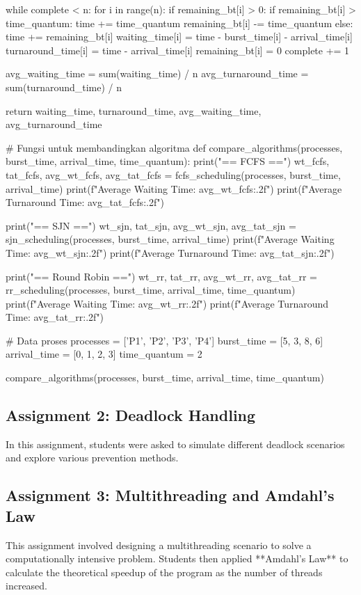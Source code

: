 \documentclass[12pt]{article}
\begin{document}
\begin{python}
    while complete < n:
        for i in range(n):
            if remaining_bt[i] > 0:
                if remaining_bt[i] > time_quantum:
                    time += time_quantum
                    remaining_bt[i] -= time_quantum
                else:
                    time += remaining_bt[i]
                    waiting_time[i] = time - burst_time[i] - arrival_time[i]
                    turnaround_time[i] = time - arrival_time[i]
                    remaining_bt[i] = 0
                    complete += 1

    avg_waiting_time = sum(waiting_time) / n
    avg_turnaround_time = sum(turnaround_time) / n

    return waiting_time, turnaround_time, avg_waiting_time, avg_turnaround_time

# Fungsi untuk membandingkan algoritma
def compare_algorithms(processes, burst_time, arrival_time, time_quantum):
    print("== FCFS ==")
    wt_fcfs, tat_fcfs, avg_wt_fcfs, avg_tat_fcfs = fcfs_scheduling(processes, burst_time, arrival_time)
    print(f"Average Waiting Time: {avg_wt_fcfs:.2f}")
    print(f"Average Turnaround Time: {avg_tat_fcfs:.2f}\n")

    print("== SJN ==")
    wt_sjn, tat_sjn, avg_wt_sjn, avg_tat_sjn = sjn_scheduling(processes, burst_time, arrival_time)
    print(f"Average Waiting Time: {avg_wt_sjn:.2f}")
    print(f"Average Turnaround Time: {avg_tat_sjn:.2f}\n")

    print("== Round Robin ==")
    wt_rr, tat_rr, avg_wt_rr, avg_tat_rr = rr_scheduling(processes, burst_time, arrival_time, time_quantum)
    print(f"Average Waiting Time: {avg_wt_rr:.2f}")
    print(f"Average Turnaround Time: {avg_tat_rr:.2f}\n")

# Data proses
processes = ['P1', 'P2', 'P3', 'P4']
burst_time = [5, 3, 8, 6]
arrival_time = [0, 1, 2, 3]
time_quantum = 2

compare_algorithms(processes, burst_time, arrival_time, time_quantum)

\end{python}


\subsection{Assignment 2: Deadlock Handling}
In this assignment, students were asked to simulate different deadlock scenarios and explore various prevention methods.

\subsection{Assignment 3: Multithreading and Amdahl's Law}
This assignment involved designing a multithreading scenario to solve a computationally intensive problem. Students then applied **Amdahl's Law** to calculate the theoretical speedup of the program as the number of threads increased.
\end{document}
